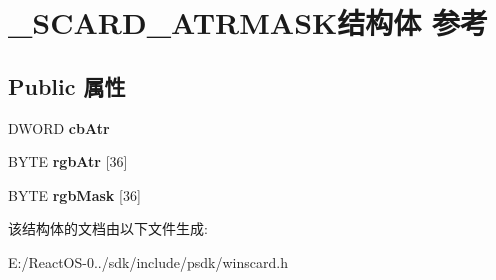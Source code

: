 \hypertarget{struct___s_c_a_r_d___a_t_r_m_a_s_k}{}\section{\+\_\+\+S\+C\+A\+R\+D\+\_\+\+A\+T\+R\+M\+A\+S\+K结构体 参考}
\label{struct___s_c_a_r_d___a_t_r_m_a_s_k}
\subsection*{Public 属性}
\begin{DoxyCompactItemize}
\item 
\mbox{\label{struct___s_c_a_r_d___a_t_r_m_a_s_k_a4c2133e5c3d9bf93fd9fe41d5160f634}} 
D\+W\+O\+RD {\bfseries cb\+Atr}
\item 
\mbox{\label{struct___s_c_a_r_d___a_t_r_m_a_s_k_ad5fbec16962ab1237d96e57f77011921}} 
B\+Y\+TE {\bfseries rgb\+Atr} \mbox{[}36\mbox{]}
\item 
\mbox{\label{struct___s_c_a_r_d___a_t_r_m_a_s_k_a26273d8fd4a14b29b38de76c6c26b5c9}} 
B\+Y\+TE {\bfseries rgb\+Mask} \mbox{[}36\mbox{]}
\end{DoxyCompactItemize}


该结构体的文档由以下文件生成\+:\begin{DoxyCompactItemize}
\item 
E\+:/\+React\+O\+S-\/0../sdk/include/psdk/winscard.\+h\end{DoxyCompactItemize}
